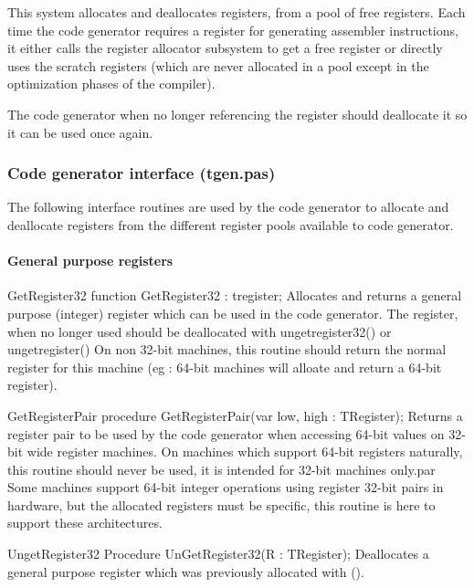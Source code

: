 \documentclass [12pt]{article}
\begin{document}
This system allocates and deallocates registers, from a pool of free
registers. Each time the code generator requires a register for generating
assembler instructions, it either calls the register allocator subsystem to
get a free register or directly uses the scratch registers (which are never
allocated in a pool except in the optimization phases of the compiler).

The code generator when no longer referencing the register should deallocate 
it so it can be used once again.

\subsubsection{Code generator interface (tgen.pas)}
\label{subsubsec:mylabel29}

The following interface routines are used by the code generator to allocate 
and deallocate registers from the different register pools available to code 
generator.

\paragraph{General purpose registers}

\begin{function}{GetRegister32}
\Declaration
function GetRegister32 : tregister;
\Description 
Allocates and returns a general purpose (integer) register which can be used
in the code generator. The register, when no longer used should be
deallocated with ungetregister32() or ungetregister() 
\Notes 
On non 32-bit machines, this routine should return the normal register for
this machine (eg : 64-bit machines will alloate and return a 64-bit
register). 
\end{function}

\begin{procedure}{GetRegisterPair}
\Declaration
procedure GetRegisterPair(var low, high : TRegister);
\Description
Returns a register pair to be used by the code generator when accessing
64-bit values on 32-bit wide register machines. 
\Notes 
On machines which support 64-bit registers naturally, this routine should
never be used, it is intended for 32-bit machines only.par Some machines
support 64-bit integer operations using register 32-bit pairs in hardware,
but the allocated registers must be specific, this routine is here to
support these architectures.
\end{procedure}

\begin{procedure}{UngetRegister32}
\Declaration
Procedure UnGetRegister32(R : TRegister);
\Description 
Deallocates a general purpose register which was previously allocated with
().
\end{procedure}
\end{document}
